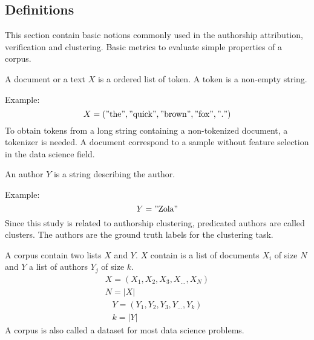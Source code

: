 \subsection{Definitions \label{sec:definitions}}

This section contain basic notions commonly used in the authorship attribution, verification and clustering.
Basic metrics to evaluate simple properties of a corpus.

\begin{definition}
  A document or a text $X$ is a ordered list of token.
  A token is a non-empty string.

  Example:
  \begin{equation}
    X = ("\text{the}", "\text{quick}", "\text{brown}", "\text{fox}", "\text{.}")
  \end{equation}
  To obtain tokens from a long string containing a non-tokenized document, a tokenizer is needed.
  A document correspond to a sample without feature selection in the data science field.
\end{definition}

\begin{definition}[Author]
  An author $Y$ is a string describing the author.

  Example:
  \begin{equation}
    Y = "\text{Zola}"
  \end{equation}
  Since this study is related to authorship clustering, predicated authors are called clusters.
  The authors are the ground truth labels for the clustering task.
\end{definition}

\begin{definition}[Corpus]
  A corpus contain two lists $X$ and $Y$.
  $X$ contain is a list of documents $X_i$ of size $N$ and $Y$ a list of authors $Y_j$ of size $k$.
  \begin{gather}
    X = (X_1, X_2, X_3, X_{...}, X_N) \\
    N = |X|
  \end{gather}
  \begin{gather}
    Y = (Y_1, Y_2, Y_3, Y_{...}, Y_k) \\
    k = |Y|
  \end{gather}
  A corpus is also called a dataset for most data science problems.
\end{definition}


